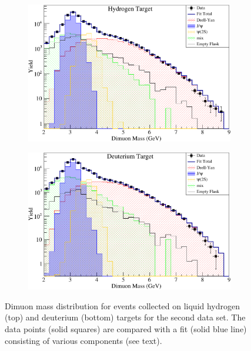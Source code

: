 \documentclass[reprint,aps,unsortedaddress,superscriptaddress,prl,floatfix,showpacs,linenumbers,final]{revtex4-2}
\begin{document}
\begin{figure}[htbp!]
	\centering
	\begin{subfigure}{\linewidth}
		\includegraphics[width=\linewidth]{massfit_run56_LH2.pdf}
	\end{subfigure}
	\begin{subfigure}{\linewidth}
		\includegraphics[width=\linewidth]{massfit_run56_LD2.pdf}
	\end{subfigure}
	\caption{Dimuon mass distribution for events collected
		on liquid hydrogen (top) and deuterium (bottom) targets for the second data set.
		The data points (solid squares) are compared with a fit (solid blue line) consisting of
		various components (see text).}
	\label{fig:massfit}
\end{figure}
\end{document}

